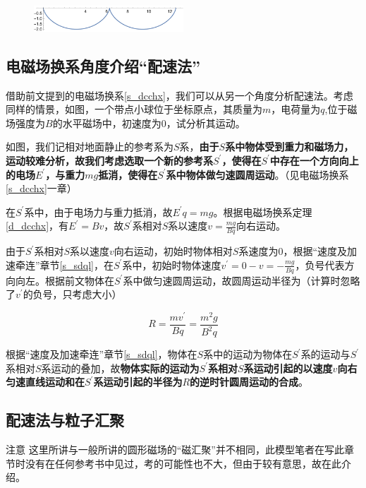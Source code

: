 \begin{figure}[htbp]
\centering
\includegraphics[width=0.5\textwidth]{pic_eled/psf_p3.pdf}
\end{figure}

\subsection{电磁场换系角度介绍“配速法”}

借助前文提到的电磁场换系\eqref{s_dcchx}，我们可以从另一个角度分析配速法。考虑同样的情景，如图，一个带点小球位于坐标原点，其质量为$m$，电荷量为$q$,位于磁场强度为$B$的水平磁场中，初速度为$0$，试分析其运动。



如图，我们记相对地面静止的参考系为$S$系，\textbf{由于$S$系中物体受到重力和磁场力，运动较难分析，故我们考虑选取一个新的参考系$S^{\prime}$，使得在$S^{\prime}$中存在一个方向向上的电场$E^{\prime}$，与重力$mg$抵消，使得在$S^{\prime}$系中物体做匀速圆周运动}。（见电磁场换系\eqref{s_dcchx}一章）

在$S^{\prime}$系中，由于电场力与重力抵消，故$E^{\prime} q = m g$。根据电磁场换系定理\eqref{d_dcchx}，有$E^{\prime} = B v$，故$S^{\prime}$系相对$S$系以速度$v = \frac{mg}{Bq}$向右运动。

由于$S^{\prime}$系相对$S$系以速度$v$向右运动，初始时物体相对$S$系速度为$0$，根据“速度及加速牵连”章节\eqref{s_sdql}，在$S^{\prime}$系中，初始时物体速度$v^{\prime} = 0 - v = -\frac{mg}{Bq}$，负号代表方向向左。根据前文物体在$S^{\prime}$系中做匀速圆周运动，故圆周运动半径为（计算时忽略了$v^{\prime}$的负号，只考虑大小）

$$R = \frac{mv^{\prime}}{Bq} = \frac{m^2 g}{B^2 q}$$

根据“速度及加速牵连”章节\eqref{s_sdql}，物体在$S$系中的运动为物体在$S^{\prime}$系的运动与$S^{\prime}$系相对$S$系运动的叠加，故\textbf{物体实际的运动为$S^{\prime}$系相对$S$系运动引起的以速度$v$向右匀速直线运动和在$S^{\prime}$系运动引起的半径为$R$的逆时针圆周运动的合成}。

\subsection{配速法与粒子汇聚}

\begin{mk}{注意}{}
这里所讲与一般所讲的圆形磁场的“磁汇聚”并不相同，此模型笔者在写此章节时没有在任何参考书中见过，考的可能性也不大，但由于较有意思，故在此介绍。
\end{mk}

